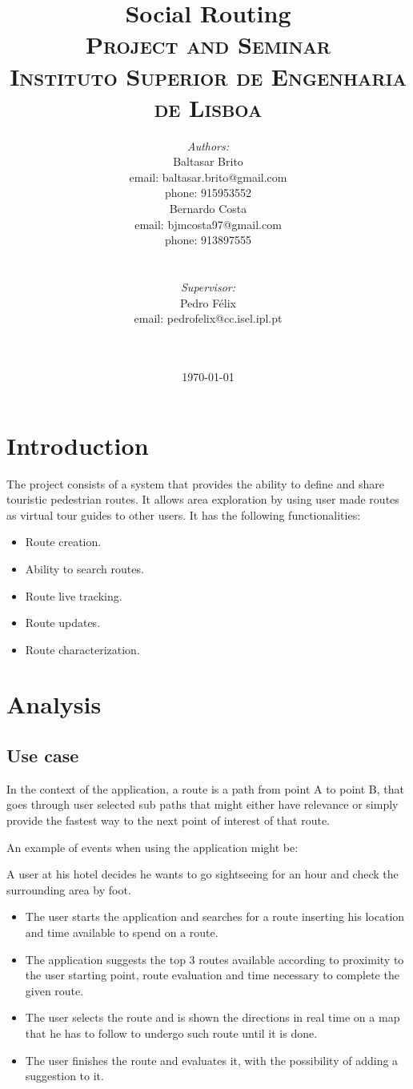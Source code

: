 \documentclass{article}
\title{
    \vspace{-4.0cm}
    {\Huge Social Routing}\\[0.5cm]    
    \textsc{\Large Project and Seminar}\\[0.5cm]
    \textsc{\large Instituto Superior de Engenharia de Lisboa}\\[0.5cm]
}
\date{\today}
\author{   
    \begin{minipage}{0.4\textwidth}
        \begin{flushleft} \large
        \emph{Authors:}\\
        Baltasar Brito\\
        {\small email: baltasar.brito@gmail.com}\\
        {\small phone: 915953552}\\
        Bernardo Costa\\
        {\small email: bjmcosta97@gmail.com}\\
        {\small phone: 913897555}\\
        \end{flushleft}
    \end{minipage}
    ~
    \begin{minipage}{0.4\textwidth}
        \begin{flushright} \large
        \emph{Supervisor:} \\ 
        Pedro Félix\\
        {\small email: pedrofelix@cc.isel.ipl.pt}\\  
        \end{flushright}
    \end{minipage}\\[2cm]  
}
\begin{document}
     
    
    \maketitle
 
    \section{Introduction} 

        The project consists of a system that provides the ability to define and share touristic pedestrian routes. It allows
        area exploration by using user made routes as virtual tour guides to other users. It has the following functionalities:
        \begin{itemize}
            \item Route creation.
            \item Ability to search routes.
            \item Route live tracking.
            \item Route updates.
            \item Route characterization.
        \end{itemize}

    \newpage
    

    \section{Analysis}

        \subsection{Use case}
            In the context of the application, a route is a path from point A to point B, that goes through user selected sub paths
            that might either have relevance or simply provide the fastest way to the next point of interest of that route. 

            An example of events when using the application might be:

            A user at his hotel decides he wants to go sightseeing for an hour and check the surrounding area by foot.
        
        \begin{itemize}  
            \item The user starts the application and searches for a route inserting his location and time available to spend on a route.
            \item The application suggests the top 3 routes available according to proximity to the user starting point, route evaluation and time necessary to complete the given route. 
            \item The user selects the route and is shown the directions in real time on a map that he has to follow to undergo such route until it is done.
            \item The user finishes the route and evaluates it, with the possibility of adding a suggestion to it. 
        \end{itemize}
        
\end{document}
